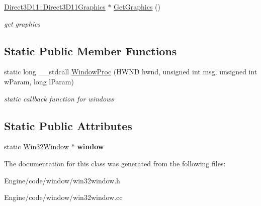 \begin{DoxyCompactItemize}
\mbox{\label{class_window_1_1_win32_window_ab5f0109dc4ff6860e8d3de4ca42479ef}} 
\mbox{\hyperlink{class_direct3_d11_1_1_direct3_d11_graphics}{Direct3\+D11\+::\+Direct3\+D11\+Graphics}} $\ast$ \mbox{\hyperlink{class_window_1_1_win32_window_ab5f0109dc4ff6860e8d3de4ca42479ef}{Get\+Graphics}} ()
\begin{DoxyCompactList}\small\item\em get graphics \end{DoxyCompactList}\end{DoxyCompactItemize}
\subsection*{Static Public Member Functions}
\begin{DoxyCompactItemize}
\item 
\mbox{\label{class_window_1_1_win32_window_a3b548fe8e0998221421760071b659334}} 
static long \+\_\+\+\_\+stdcall \mbox{\hyperlink{class_window_1_1_win32_window_a3b548fe8e0998221421760071b659334}{Window\+Proc}} (H\+W\+ND hwnd, unsigned int msg, unsigned int w\+Param, long l\+Param)
\begin{DoxyCompactList}\small\item\em static callback function for windows \end{DoxyCompactList}\end{DoxyCompactItemize}
\subsection*{Static Public Attributes}
\begin{DoxyCompactItemize}
\item 
\mbox{\label{class_window_1_1_win32_window_a3e1f92110e91e2bf490377dd0fa0253a}} 
static \mbox{\hyperlink{class_window_1_1_win32_window}{Win32\+Window}} $\ast$ {\bfseries window}
\end{DoxyCompactItemize}


The documentation for this class was generated from the following files\+:\begin{DoxyCompactItemize}
\item 
Engine/code/window/win32window.\+h\item 
Engine/code/window/win32window.\+cc\end{DoxyCompactItemize}
